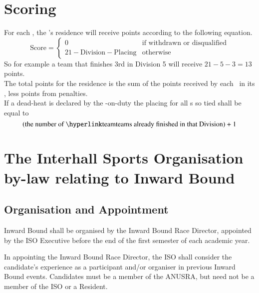 \documentclass[12pt]{report}
\begin{document}
  \chapter{Scoring}\label{appendix:scoring}
  For each \team, the \team's residence will receive points according to the following equation.
  \[\text{Score} = \begin{cases}0 &\text{if withdrawn or disqualified} \\ 21 - \text{Division} - \text{Placing} &\text{otherwise} \end{cases}\]
  So for example a team that finishes 3rd in Division 5 will receive $21-5-3=13$ points. \\[12pt]
  The total points for the residence is the sum of the points received by each \team\ in its \squad, less points from penalties.\\[12pt]
  If a dead-heat is declared by the \chiefjudge-on-duty the placing for all \team s so tied shall be equal to
  \[(\text{the number of \team s already finished in that Division})+1\]
  \chapter{The Interhall Sports Organisation by-law relating to Inward Bound}

\section{Organisation and Appointment}
Inward Bound shall be organised by the Inward Bound Race Director, appointed
by the ISO Executive before the end of the first semester of each academic year.

In appointing the Inward Bound Race Director, the ISO shall consider the
candidate's experience as a participant and/or organiser in previous Inward Bound
events. Candidates must be a member of the ANUSRA, but need not be a member
of the ISO or a Resident.
\end{document}
